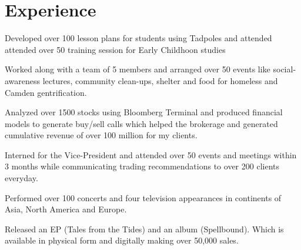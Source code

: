 \documentclass[]{deedy-resume-openfont}
\begin{document}
\hfill
\begin{minipage}[t]{0.66\textwidth} 


\section{Experience}

\vspace{\topsep} %
\begin{tightemize}\item Developed over 100 lesson plans for students using Tadpoles and attended attended over 50 training session for Early Childhoon studies
\end{tightemize}
\sectionsep

\begin{tightemize}
\item Worked along with a team of 5 members and arranged over 50 events like social-awareness lectures, community clean-ups, shelter and food for homeless and Camden gentrification.\end{tightemize}
\sectionsep

\begin{tightemize}
\item Analyzed over 1500 stocks using Bloomberg Terminal and produced financial models to generate buy/sell calls which helped the brokerage and generated cumulative revenue of over 100 million for my clients.\end{tightemize}
\sectionsep

\begin{tightemize}
\item Interned for the Vice-President and attended over 50 events and meetings within 3 months while communicating trading recommendations  to over 200 clients everyday.
\end{tightemize}
\sectionsep

\begin{tightemize}
\item Performed over 100 concerts and four television appearances in continents of Asia, North America and Europe.\item Released an EP (Tales from the Tides) and an album (Spellbound). Which is available in physical form and digitally making over 50,000 sales.
\end{tightemize}
\sectionsep


\end{minipage}
\end{document}
